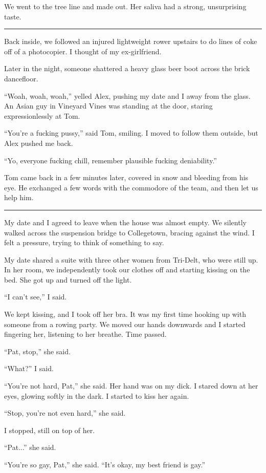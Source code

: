 We went to the tree line and made out.  Her saliva had a strong, unsurprising
taste.

\plainfancybreak{12pt}{2}{}

Back inside, we followed an injured lightweight rower upstairs to do lines of
coke off of a photocopier.  I thought of my ex-girlfriend.

Later in the night, someone shattered a heavy glass beer boot across the brick
dancefloor.  

``Woah, woah, woah,'' yelled Alex, pushing my date and I away from the glass.
An Asian guy in Vineyard Vines was standing at the door, staring
expressionlessly at Tom.

``You're a fucking pussy,'' said Tom, smiling.  I moved to follow them outside,
but Alex pushed me back.

``Yo, everyone fucking chill, remember plausible fucking deniability.''

Tom came back in a few minutes later, covered in snow and bleeding from his eye.
He exchanged a few words with the commodore of the team, and then let us help
him.

\plainfancybreak{12pt}{2}{}

My date and I agreed to leave when the house was almost empty.  We silently
walked across the suspension bridge to Collegetown, bracing against the wind.  I
felt a pressure, trying to think of something to say.

My date shared a suite with three other women from Tri-Delt, who were still up.
In her room, we independently took our clothes off and starting kissing on the
bed.  She got up and turned off the light.

``I can't see,'' I said.  

We kept kissing, and I took off her bra.  It was my first time hooking up with
someone from a rowing party.  We moved our hands downwards and I started
fingering her, listening to her breathe.  Time passed.

``Pat, stop,'' she said.

``What?'' I said.

``You're not hard, Pat,'' she said.  Her hand was on my dick.  I stared down at
her eyes, glowing softly in the dark.  I started to kiss her again.

``Stop, you're not even hard,'' she said.

I stopped, still on top of her.

``Pat...'' she said.

``You're so gay, Pat,'' she said.  ``It's okay, my best friend is gay.''

